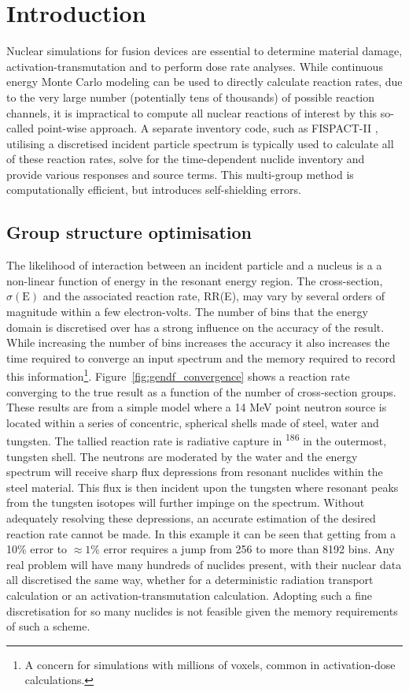 \section{Introduction}

Nuclear simulations for fusion devices are essential to determine material damage, activation-transmutation and to perform dose rate analyses. While continuous energy Monte Carlo modeling can be used to directly calculate reaction rates, due to the very large number (potentially tens of thousands) of possible reaction channels, it is impractical to compute all nuclear reactions of interest by this so-called point-wise approach. A separate inventory code, such as FISPACT-II \cite{fispact2015}, utilising a discretised incident particle spectrum is typically used to calculate all of these reaction rates, solve for the time-dependent nuclide inventory and provide various responses and source terms. This multi-group method is computationally efficient, but introduces self-shielding errors.

\subsection{Group structure optimisation}
The likelihood of interaction between an incident particle and a nucleus is a a non-linear function of energy in the resonant energy region. The cross-section, $\sigma(\mathrm{E})$ and the associated reaction rate, RR(E), may vary by several orders of magnitude within a few electron-volts. The number of bins that the energy domain is discretised over has a strong influence on the accuracy of the result. While increasing the number of bins increases the accuracy it also increases the time required to converge an input spectrum and the memory required to record this information\footnote{A concern for simulations with millions of voxels, common in activation-dose calculations.}. Figure~\ref{fig:gendf_convergence} shows a reaction rate converging to the true result as a function of the number of cross-section groups. These results are from a simple model where a 14 MeV point neutron source is located within a series of concentric, spherical shells made of steel, water and tungsten. The tallied reaction rate is radiative capture in \textsuperscript{186} in the outermost, tungsten shell. The neutrons are moderated by the water and the energy spectrum will receive sharp flux depressions from resonant nuclides within the steel material. This flux is then incident upon the tungsten where resonant peaks from the tungsten isotopes will further impinge on the spectrum. Without adequately resolving these depressions, an accurate estimation of the desired reaction rate cannot be made. In this example it can be seen that getting from a 10\% error to $\approx 1\%$ error requires a jump from 256 to more than 8192 bins. Any real problem will have many hundreds of nuclides present, with their nuclear data all discretised the same way, whether for a deterministic radiation transport calculation or an activation-transmutation calculation. Adopting such a fine discretisation for so many nuclides is not feasible given the memory requirements of such a scheme.

